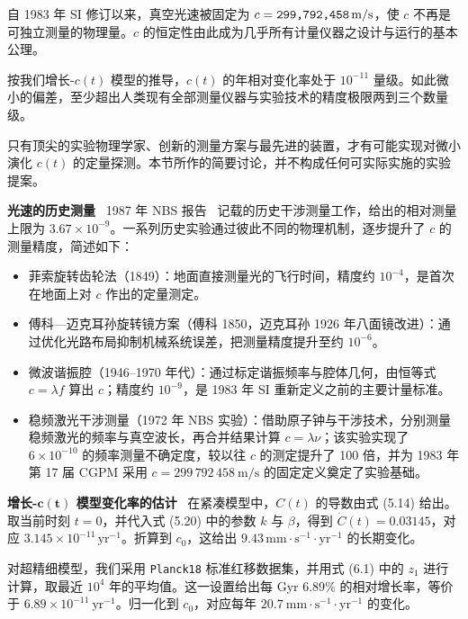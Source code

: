 \documentclass[12pt,leqno]{article}
\begin{document}
	自 1983 年 SI 修订以来，真空光速被固定为 $c = \texttt{299,792,458} \text{\,m/s}$，使 $c$ 不再是可独立测量的物理量。$c$ 的恒定性由此成为几乎所有计量仪器之设计与运行的基本公理。
	
	\medskip
	按我们增长-$c(t)$ 模型的推导，$c(t)$ 的年相对变化率处于 $10^{-11}$ 量级。如此微小的偏差，至少超出人类现有全部测量仪器与实验技术的精度极限两到三个数量级。 
	
	\medskip
	只有顶尖的实验物理学家、创新的测量方案与最先进的装置，才有可能实现对微小演化 $c(t)$ 的定量探测。本节所作的简要讨论，并不构成任何可实际实施的实验提案。

	
	
	\bigskip
	\textbf{光速的历史测量}\,\,\,
	1987 年 NBS 报告~\cite{NBS:1987} 记载的历史干涉测量工作，给出的相对测量上限为 $3.67\times 10^{-9}$。一系列历史实验通过彼此不同的物理机制，逐步提升了 $c$ 的测量精度，简述如下：
	\begin{itemize}
		\item 菲索旋转齿轮法（1849）：地面直接测量光的飞行时间，精度约 $10^{-4}$，是首次在地面上对 $c$ 作出的定量测定。

		\item 傅科—迈克耳孙旋转镜方案（傅科 1850，迈克耳孙 1926 年八面镜改进）：通过优化光路布局抑制机械系统误差，把测量精度提升至约 $10^{-6}$。	
		\item 微波谐振腔（1946--1970 年代）：通过标定谐振频率与腔体几何，由恒等式 $c=\lambda f$ 算出 $c$；精度约 $10^{-9}$，是 1983 年 SI 重新定义之前的主要计量标准。	
		
		\item 稳频激光干涉测量（1972 年 NBS 实验）：借助原子钟与干涉技术，分别测量稳频激光的频率与真空波长，再合并结果计算 $c=\lambda\nu$；该实验实现了 \(6\times10^{-10}\) 的频率测量不确定度，较以往 $c$ 的测定提升了 100 倍，并为 1983 年第 17 届 CGPM 采用 \(c=299\,792\,458\ \mathrm{m/s}\) 的固定定义奠定了实验基础。
	\end{itemize}
	
	
	\bigskip
	\textbf{增长-$\boldsymbol{c(t)}$ 模型变化率的估计}\,\,\,
	在紧凑模型中，$C(t)$ 的导数由式 (5.14) 给出。取当前时刻 $t=0$，并代入式 (5.20) 中的参数 $k$ 与 $\beta$，得到 $\dot{C}(t)=0.03145$，对应 $3.145 \times 10^{-11}\,\mathrm{yr}^{-1}$。折算到 $c_0$，这给出 $9.43\,\mathrm{mm\!\cdot\!s^{-1}\!\cdot\!yr^{-1}}$ 的长期变化。
	
	\medskip
	对超精细模型，我们采用 \texttt{Planck18} 标准红移数据集，并用式 (6.1) 中的 $z_1$ 进行计算，取最近 $10^4$ 年的平均值。这一设置给出每 Gyr $6.89\%$ 的相对增长率，等价于 $6.89 \times 10^{-11}\ \mathrm{yr}^{-1}$。归一化到 $c_0$，对应每年 $20.7\ \mathrm{mm\!\cdot\!s^{-1}\!\cdot\!yr^{-1}}$ 的变化。
	
\end{document}
